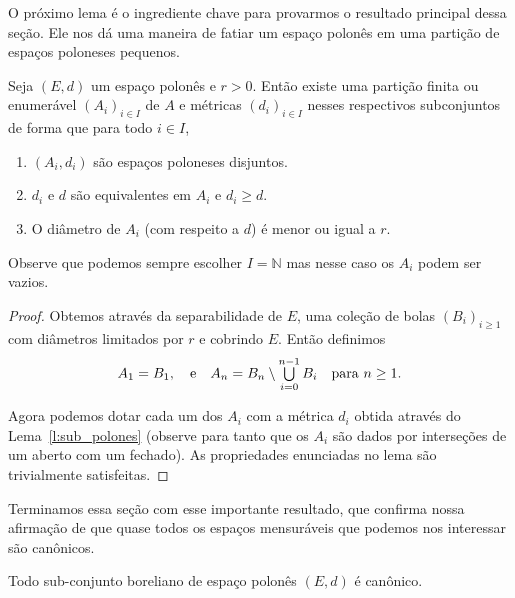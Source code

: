 O próximo lema é o ingrediente chave para provarmos o resultado principal dessa seção.
Ele nos dá uma maneira de fatiar um espaço polonês em uma partição de espaços poloneses pequenos.

\begin{lemma}
  \label{l:particao_polones}
  Seja $(E, d)$ um espaço polonês e $r > 0$.
  Então existe uma partição finita ou enumerável $(A_i)_{i\in I}$ de $A$ e métricas $(d_i)_{i\in I}$ nesses respectivos subconjuntos de forma
  que para todo $i\in I$,
  \begin{enumerate}[\quad a)]
  \item $(A_i, d_i)$ são espaços poloneses disjuntos.
  \item $d_i$ e $d$ são equivalentes em $A_i$ e $d_i \geq d$.
  \item O diâmetro de $A_i$ (com respeito a $d$) é menor ou igual a $r$.
  \end{enumerate}
  Observe que podemos sempre escolher $I=\mathbb{N}$ mas nesse caso os $A_i$ podem ser vazios.
\end{lemma}

\begin{proof}
  Obtemos através da separabilidade de $E$, uma coleção de bolas $(B_i)_{i \geq 1}$ com diâmetros limitados por $r$ e cobrindo $E$.
  Então definimos
  \begin{equation}
    A_1 = B_1, \quad \text{e} \quad A_n = B_n \setminus \operatorname*{{\textstyle \bigcup}}_{i=0}^{n-1} B_i \quad \text{para $n \geq 1$.}
  \end{equation}

  Agora podemos dotar cada um dos $A_i$ com a métrica $d_i$ obtida através do Lema~\ref{l:sub_polones} (observe para tanto que os $A_i$ são dados por interseções de um aberto com um fechado).
  As propriedades enunciadas no lema são trivialmente satisfeitas.
\end{proof}

Terminamos essa seção com esse importante resultado, que confirma nossa afirmação de que quase todos os espaços mensuráveis que podemos nos interessar são canônicos.

\begin{theorem}
  Todo sub-conjunto boreliano de espaço polonês $(E, d)$ é canônico.
\end{theorem}

